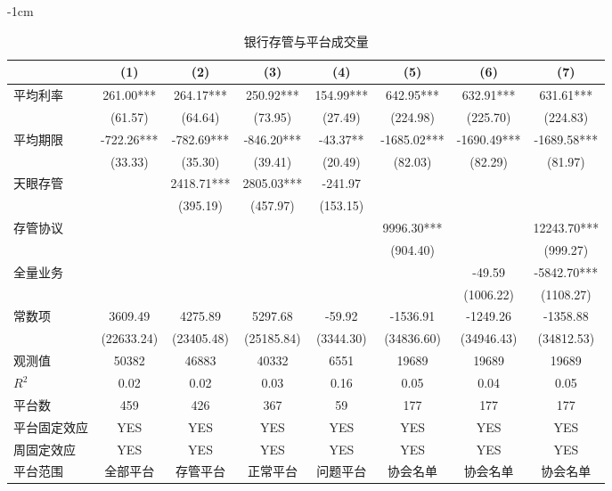 \documentclass[lang=cn,11pt]{elegantpaper}
\begin{document}
\begin{table}[htbp]
  \centering
    \addtolength{\leftskip} {-1cm}
    \addtolength{\rightskip}{-1cm}
  \caption{银行存管与平台成交量}
    \begin{tabular}{lccccccc}
    \toprule
          & (1)   & (2)   & (3)   & (4)   & (5)   & (6)   & (7) \\
    \midrule
    平均利率  & 261.00*** & 264.17*** & 250.92*** & 154.99*** & 642.95*** & 632.91*** & 631.61*** \\
          & (61.57) & (64.64) & (73.95) & (27.49) & (224.98) & (225.70) & (224.83) \\
    平均期限  & -722.26*** & -782.69*** & -846.20*** & -43.37** & -1685.02*** & -1690.49*** & -1689.58*** \\
          & (33.33) & (35.30) & (39.41) & (20.49) & (82.03) & (82.29) & (81.97) \\
    天眼存管  &       & 2418.71*** & 2805.03*** & -241.97 &       &       &  \\
          &       & (395.19) & (457.97) & (153.15) &       &       &  \\
    存管协议  &       &       &       &       & 9996.30*** &       & 12243.70*** \\
          &       &       &       &       & (904.40) &       & (999.27) \\
    全量业务  &       &       &       &       &       & -49.59 & -5842.70*** \\
          &       &       &       &       &       & (1006.22) & (1108.27) \\
    常数项   & 3609.49 & 4275.89 & 5297.68 & -59.92 & -1536.91 & -1249.26 & -1358.88 \\
          & (22633.24) & (23405.48) & (25185.84) & (3344.30) & (34836.60) & (34946.43) & (34812.53) \\
    观测值   & 50382 & 46883 & 40332 & 6551  & 19689 & 19689 & 19689 \\
    $R^{2}$    & 0.02  & 0.02  & 0.03  & 0.16  & 0.05  & 0.04  & 0.05 \\
    平台数   & 459   & 426   & 367   & 59    & 177   & 177   & 177 \\
    平台固定效应 & YES   & YES   & YES   & YES   & YES   & YES   & YES \\
    周固定效应 & YES   & YES   & YES   & YES   & YES   & YES   & YES \\
    平台范围  & 全部平台  & 存管平台  & 正常平台  & 问题平台  & 协会名单  & 协会名单  & 协会名单 \\
    \bottomrule
    \end{tabular}%
  \label{tab:volreg}%
\end{table}%
\end{document}
